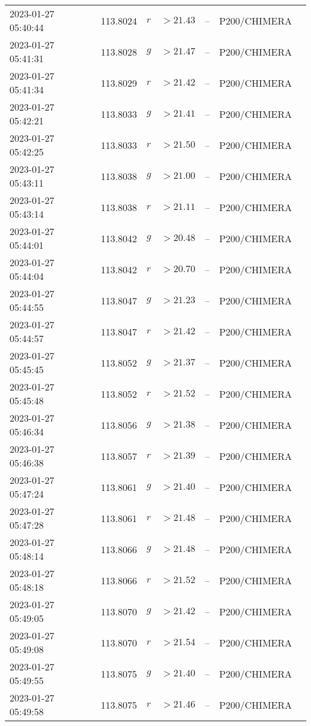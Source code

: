\documentclass{nature_plusfigure}
\begin{document}
\begin{supplement}
\begin{center}
\begin{longtable}{lllllll}
2023-01-27 05:40:44 & 113.8024 & $r$ & $>21.43$ & -- & P200/CHIMERA &  \\ 
2023-01-27 05:41:31 & 113.8028 & $g$ & $>21.47$ & -- & P200/CHIMERA &  \\ 
2023-01-27 05:41:34 & 113.8029 & $r$ & $>21.42$ & -- & P200/CHIMERA &  \\ 
2023-01-27 05:42:21 & 113.8033 & $g$ & $>21.41$ & -- & P200/CHIMERA &  \\ 
2023-01-27 05:42:25 & 113.8033 & $r$ & $>21.50$ & -- & P200/CHIMERA &  \\ 
2023-01-27 05:43:11 & 113.8038 & $g$ & $>21.00$ & -- & P200/CHIMERA &  \\ 
2023-01-27 05:43:14 & 113.8038 & $r$ & $>21.11$ & -- & P200/CHIMERA &  \\ 
2023-01-27 05:44:01 & 113.8042 & $g$ & $>20.48$ & -- & P200/CHIMERA &  \\ 
2023-01-27 05:44:04 & 113.8042 & $r$ & $>20.70$ & -- & P200/CHIMERA &  \\ 
2023-01-27 05:44:55 & 113.8047 & $g$ & $>21.23$ & -- & P200/CHIMERA &  \\ 
2023-01-27 05:44:57 & 113.8047 & $r$ & $>21.42$ & -- & P200/CHIMERA &  \\ 
2023-01-27 05:45:45 & 113.8052 & $g$ & $>21.37$ & -- & P200/CHIMERA &  \\ 
2023-01-27 05:45:48 & 113.8052 & $r$ & $>21.52$ & -- & P200/CHIMERA &  \\ 
2023-01-27 05:46:34 & 113.8056 & $g$ & $>21.38$ & -- & P200/CHIMERA &  \\ 
2023-01-27 05:46:38 & 113.8057 & $r$ & $>21.39$ & -- & P200/CHIMERA &  \\ 
2023-01-27 05:47:24 & 113.8061 & $g$ & $>21.40$ & -- & P200/CHIMERA &  \\ 
2023-01-27 05:47:28 & 113.8061 & $r$ & $>21.48$ & -- & P200/CHIMERA &  \\ 
2023-01-27 05:48:14 & 113.8066 & $g$ & $>21.48$ & -- & P200/CHIMERA &  \\ 
2023-01-27 05:48:18 & 113.8066 & $r$ & $>21.52$ & -- & P200/CHIMERA &  \\ 
2023-01-27 05:49:05 & 113.8070 & $g$ & $>21.42$ & -- & P200/CHIMERA &  \\ 
2023-01-27 05:49:08 & 113.8070 & $r$ & $>21.54$ & -- & P200/CHIMERA &  \\ 
2023-01-27 05:49:55 & 113.8075 & $g$ & $>21.40$ & -- & P200/CHIMERA &  \\ 
2023-01-27 05:49:58 & 113.8075 & $r$ & $>21.46$ & -- & P200/CHIMERA &  \\ 

\end{longtable}
\end{center}
\end{supplement}
\end{document}
